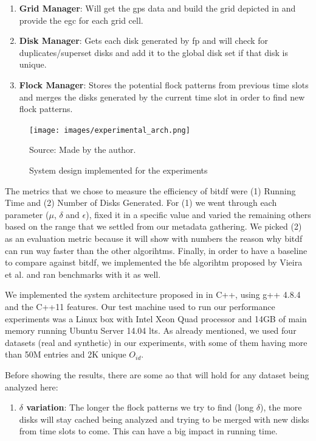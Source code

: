 {\begin{enumerate}
    \item \textbf{Grid Manager}: Will get the \ac{gps} data and build the grid depicted in  and provide
        the \ac{egc} for each grid cell.
    \item \textbf{Disk Manager}: Gets each disk generated by \ac{fp} and will check for duplicates/superset disks and
        add it to the global disk set if that disk is unique.
    \item \textbf{Flock Manager}: Stores the potential flock patterns from previous time slots and merges the disks
        generated by the current time slot in order to find new flock patterns.
\end{enumerate}

\begin{figure}[h!]
    \centering
    \caption{System design implemented for the experiments}
    \centerline{\texttt{[image: images/experimental\_arch.png]}}
    \footnotesize{Source: Made by the author.}
    \label{fig:experimental_arch}
\end{figure}

The metrics that we chose to measure the efficiency of \ac{bitdf} were (1) Running Time and (2) Number of Disks
Generated. For (1) we went through each parameter ($\mu$, $\delta$ and $\epsilon$), fixed it in a specific value and
varied the remaining others based on the range that we settled from our metadata gathering. We picked (2) as an
evaluation metric because it will show with numbers the reason why \ac{bitdf} can run way faster than the other
algorihtms. Finally, in order to have a baseline to compare against \ac{bitdf}, we implemented the \ac{bfe} algorihtm
proposed by Vieira et al. \citep{vieira} and ran benchmarks with it as well.

We implemented the system architecture proposed in  in C++, using g++ 4.8.4 and the C++11
\citep{cpp11spec} features. Our test machine used to run our performance experiments was a Linux box with Intel Xeon
Quad processor and 14GB of main memory running Ubuntu Server 14.04 \ac{lts}. As already mentioned, we used four datasets
(real and synthetic) in our experiments, with some of them having more than 50M entries and 2K unique $O_{id}$.

Before showing the results, there are some \ac{ao} that will hold for any dataset being analyzed here:

\begin{enumerate}
    \item \textbf{$\delta$ variation}: The longer the flock patterns we try to find (long $\delta$), the more disks will
        stay cached being analyzed and trying to be merged with new disks from time slots to come. This can have a big
        impact in running time.\label{sssec:lvariation}


\end{enumerate}}
